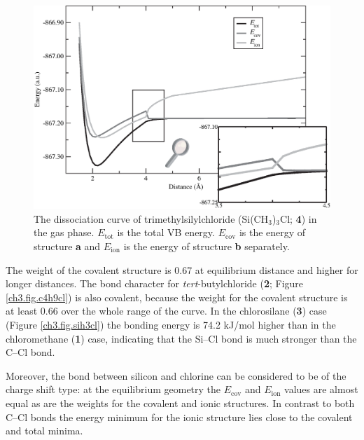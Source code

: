 \begin{figure}[hbtp]
\begin{center}
\includegraphics[scale=0.70]{dissociation/figures/c3h9sicl_g.eps}
\end{center}
\caption{The dissociation curve of trimethylsilylchloride (Si(CH$_3$)$_3$Cl; \textbf{4}) in the gas phase. $E_\mathrm{tot}$ is the total VB energy. $E_\mathrm{cov}$ is the energy of structure \textbf{a} and $E_\mathrm{ion}$ is the energy of structure \textbf{b} separately. }
\label{ch3.fig.c3h9sicl}
\end{figure}
The weight of the covalent structure is 0.67 at equilibrium distance and higher for longer distances. The bond character for \textit{tert}-butylchloride (\textbf{2}; Figure \ref{ch3.fig.c4h9cl}) is also covalent, because the weight for the covalent structure is at least 0.66 over the whole range of the curve.
In the chlorosilane (\textbf{3}) case (Figure \ref{ch3.fig.sih3cl}) the bonding energy is 74.2 kJ/mol higher than in the chloromethane (\textbf{1}) case, indicating that the Si--Cl bond is much stronger than the C--Cl bond. 

Moreover, the bond between silicon and chlorine can be considered to be of the charge shift type: at the equilibrium geometry the $E_\mathrm{cov}$ and $E_\mathrm{ion}$ values are almost equal as are the weights for the covalent and ionic structures. In contrast to both C--Cl bonds the energy minimum for the ionic structure lies close to the covalent and total minima.  

